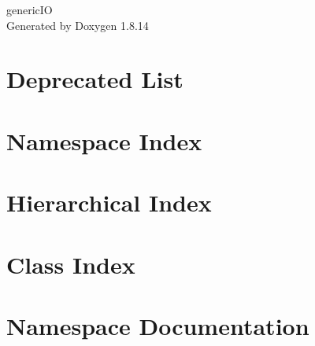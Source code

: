 \documentclass[twoside]{book}
\newcommand{\+}{\discretionary{\mbox{\scriptsize$\hookleftarrow$}}{}{}}
\newcommand{\clearemptydoublepage}{%
  \newpage{\pagestyle{empty}\cleardoublepage}%
}
\begin{document}
\hypersetup{pageanchor=false,
             bookmarksnumbered=true,
             pdfencoding=unicode
            }
\begin{titlepage}
\vspace*{7cm}
\begin{center}%
{\Large generic\+IO }\\
\vspace*{1cm}
{\large Generated by Doxygen 1.8.14}\\
\end{center}
\end{titlepage}
\clearemptydoublepage
{}
\tableofcontents
\clearemptydoublepage
{}
\hypersetup{pageanchor=true}

\chapter{Deprecated List}
\label{deprecated}

\chapter{Namespace Index}

\chapter{Hierarchical Index}

\chapter{Class Index}

\chapter{Namespace Documentation}

\end{document}
